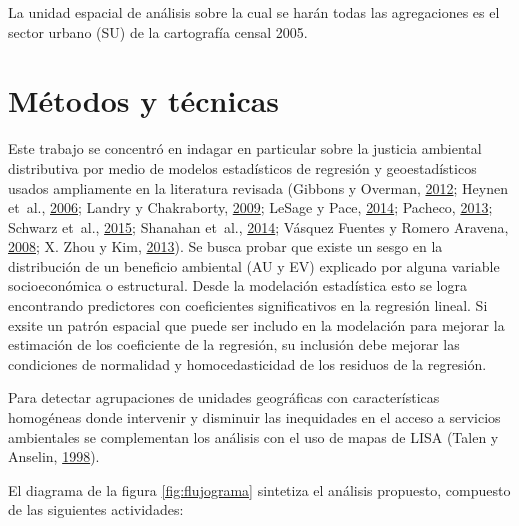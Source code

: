 \documentclass[12pt,a4paper,openany]{book}
\theoremstyle{definition}
\theoremstyle{definition}
\theoremstyle{definition}
\theoremstyle{remark}
\begin{document}
La unidad espacial de análisis sobre la cual se harán todas las
agregaciones es el sector urbano (SU) de la cartografía censal 2005.

\section{Métodos y técnicas}\label{metodos-y-tecnicas}

Este trabajo se concentró en indagar en particular sobre la justicia
ambiental distributiva por medio de modelos estadísticos de regresión y
geoestadísticos usados ampliamente en la literatura revisada (Gibbons y
Overman, \protect\hyperlink{ref-gibbons_mostly_2012}{2012}; Heynen
et~al., \protect\hyperlink{ref-heynen_political_2006}{2006}; Landry y
Chakraborty, \protect\hyperlink{ref-landry_street_2009}{2009}; LeSage y
Pace, \protect\hyperlink{ref-lesage_biggest_2014}{2014}; Pacheco,
\protect\hyperlink{ref-PACHECO2013121}{2013}; Schwarz et~al.,
\protect\hyperlink{ref-schwarz_trees_2015}{2015}; Shanahan et~al.,
\protect\hyperlink{ref-shanahan_socio-economic_2014}{2014}; Vásquez
Fuentes y Romero Aravena,
\protect\hyperlink{ref-vasquez_fuentes_vegetacion_2008}{2008}; X. Zhou y
Kim, \protect\hyperlink{ref-zhou_social_2013}{2013}). Se busca probar
que existe un sesgo en la distribución de un beneficio ambiental (AU y
EV) explicado por alguna variable socioeconómica o estructural. Desde la
modelación estadística esto se logra encontrando predictores con
coeficientes significativos en la regresión lineal. Si exsite un patrón
espacial que puede ser includo en la modelación para mejorar la
estimación de los coeficiente de la regresión, su inclusión debe mejorar
las condiciones de normalidad y homocedasticidad de los residuos de la
regresión.

Para detectar agrupaciones de unidades geográficas con características
homogéneas donde intervenir y disminuir las inequidades en el acceso a
servicios ambientales se complementan los análisis con el uso de mapas
de LISA (Talen y Anselin,
\protect\hyperlink{ref-talen_assessing_1998}{1998}).

El diagrama de la figura \ref{fig:flujograma} sintetiza el análisis
propuesto, compuesto de las siguientes actividades:
\end{document}
